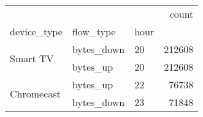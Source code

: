 \begin{tabular}{lllr}
\toprule
 &  &  & count \\
device_type & flow_type & hour &  \\
\midrule
\multirow[t]{2}{*}{Smart TV} & bytes_down & 20 & 212608 \\
\cline{2-4}
 & bytes_up & 20 & 212608 \\
\cline{1-4} \cline{2-4}
\multirow[t]{2}{*}{Chromecast} & bytes_up & 22 & 76738 \\
\cline{2-4}
 & bytes_down & 23 & 71848 \\
\cline{1-4} \cline{2-4}
\bottomrule
\end{tabular}
